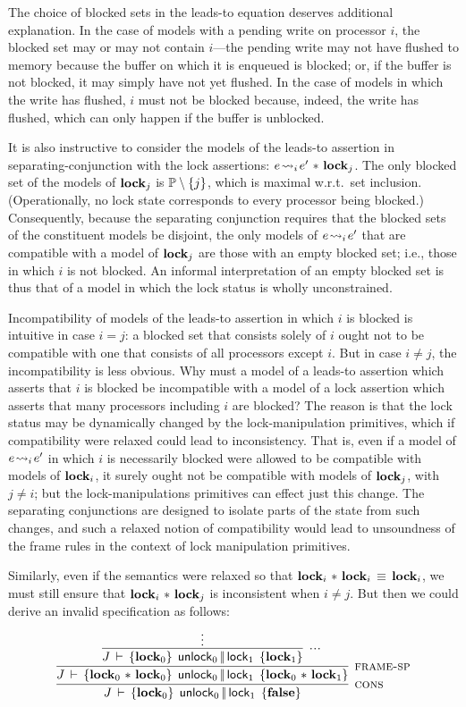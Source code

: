 \documentclass[11pt]{report}         %
\begin{document}
\begin{remark}
The choice of blocked sets in the leads-to equation deserves additional explanation. In the case of models with a pending write on processor $i$, the blocked set may or may not contain $i$---the pending write may not have flushed to memory because the buffer on which it is enqueued is blocked; or, if the buffer is not blocked, it may simply have not yet flushed. In the case of models in which the write has flushed, $i$ must not be blocked because, indeed, the write has flushed, which can only happen if the buffer is unblocked.

It is also instructive to consider the models of the leads-to assertion in separating-conjunction with the lock assertions: $e \!\leadsto_{i}\! e' \operatorname{\,\ast\,} \mathbf{lock}_{j}$. The only blocked set of the models of $\mathbf{lock}_{j}$ is $\mathbb{P} \setminus \left\lbrace j \right\rbrace$, which is maximal w.r.t.\ set inclusion. (Operationally, no lock state corresponds to every processor being blocked.) Consequently, because the separating conjunction requires that the blocked sets of the constituent models be disjoint, the only models of $e \!\leadsto_{i}\! e'$ that are compatible with a model of $\mathbf{lock}_{j}$ are those with an empty blocked set; i.e., those in which $i$ is not blocked. An informal interpretation of an empty blocked set is thus that of a model in which the lock status is wholly unconstrained. 

Incompatibility of models of the leads-to assertion in which $i$ is blocked is intuitive in case $i = j$: a blocked set that consists solely of $i$ ought not to be compatible with one that consists of all processors except $i$. But in case $i \neq j$, the incompatibility is less obvious. Why must a model of a leads-to assertion which asserts that $i$ is blocked be incompatible with a model of a lock assertion which asserts that many processors including $i$ are blocked? The reason is that the lock status may be dynamically changed by the lock-manipulation primitives, which if compatibility were relaxed could lead to inconsistency. That is, even if a model of $e \!\leadsto_{i}\! e'$ in which $i$ is necessarily blocked were allowed to be compatible with models of $\mathbf{lock}_{i}$, it surely ought not be compatible with models of $\mathbf{lock}_{j}$, with $j \neq i$; but the lock-manipulations primitives can effect just this change. The separating conjunctions are designed to isolate parts of the state from such changes, and such a relaxed notion of compatibility would lead to unsoundness of the frame rules in the context of lock manipulation primitives. 

Similarly, even if the semantics were relaxed so that $\mathbf{lock}_{i} \operatorname{\,\ast\,} \mathbf{lock}_{i} \,\equiv\, \mathbf{lock}_{i}$, we must still ensure that $\mathbf{lock}_{i} \operatorname{\,\ast\,} \mathbf{lock}_{j}$ is inconsistent when $i \neq j$. But then we could derive an invalid specification as follows: \[ \infer[\textsc{cons}]{\spec{J}{\flock{0}}{\cunlock_0 \oppar \clock_1}{\bexpf}}{\infer[\textsc{frame-sp}]{\spec{J}{\flock{0} \fsep \flock{0}}{\cunlock_0 \oppar \clock_1}{\flock{0} \fsep \flock{1}}}{\infer[\textsc{...}]{\spec{J}{\flock{0}}{\cunlock_0 \oppar \clock_1}{\flock{1}}}{\vdots}}}\] \qedsymbol \\ 
\end{remark}
\end{document}
